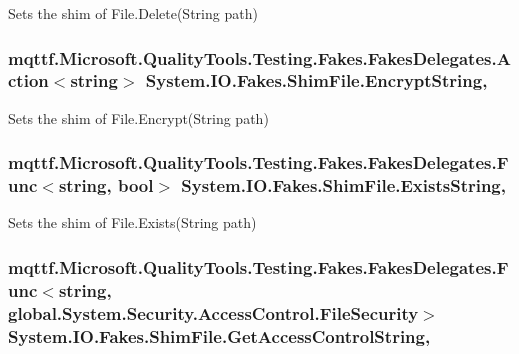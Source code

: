 Sets the shim of File.\-Delete(\-String path)

\hypertarget{class_system_1_1_i_o_1_1_fakes_1_1_shim_file_a165a68e48bc88ef3c6adf8a5d4abcf8d}{
\subsubsection[{Encrypt\-String}]{\setlength{\rightskip}{0pt plus 5cm}mqttf.\-Microsoft.\-Quality\-Tools.\-Testing.\-Fakes.\-Fakes\-Delegates.\-Action$<$string$>$ System.\-I\-O.\-Fakes.\-Shim\-File.\-Encrypt\-String\hspace{0.3cm}{\ttfamily [static]}, {\ttfamily [set]}}}\label{class_system_1_1_i_o_1_1_fakes_1_1_shim_file_a165a68e48bc88ef3c6adf8a5d4abcf8d}


Sets the shim of File.\-Encrypt(\-String path)

\hypertarget{class_system_1_1_i_o_1_1_fakes_1_1_shim_file_ab77495fbb33f9fcaa27fd8b3d0b0cda0}{
\subsubsection[{Exists\-String}]{\setlength{\rightskip}{0pt plus 5cm}mqttf.\-Microsoft.\-Quality\-Tools.\-Testing.\-Fakes.\-Fakes\-Delegates.\-Func$<$string, bool$>$ System.\-I\-O.\-Fakes.\-Shim\-File.\-Exists\-String\hspace{0.3cm}{\ttfamily [static]}, {\ttfamily [set]}}}\label{class_system_1_1_i_o_1_1_fakes_1_1_shim_file_ab77495fbb33f9fcaa27fd8b3d0b0cda0}


Sets the shim of File.\-Exists(\-String path)

\hypertarget{class_system_1_1_i_o_1_1_fakes_1_1_shim_file_a90bc1323f8746e5c1c6da950c49d461b}{
\subsubsection[{Get\-Access\-Control\-String}]{\setlength{\rightskip}{0pt plus 5cm}mqttf.\-Microsoft.\-Quality\-Tools.\-Testing.\-Fakes.\-Fakes\-Delegates.\-Func$<$string, global.\-System.\-Security.\-Access\-Control.\-File\-Security$>$ System.\-I\-O.\-Fakes.\-Shim\-File.\-Get\-Access\-Control\-String\hspace{0.3cm}{\ttfamily [static]}, {\ttfamily [set]}}}\label{class_system_1_1_i_o_1_1_fakes_1_1_shim_file_a90bc1323f8746e5c1c6da950c49d461b}


